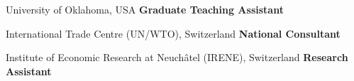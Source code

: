 	{%
		University of Oklahoma, USA}
	{%
		\textbf{Graduate Teaching Assistant}}
	{%
	}

		{%
			International Trade Centre (UN/WTO), Switzerland}
		{%
			\textbf{National Consultant}}
		{%
		}

		{%
			 Institute of Economic Research at Neuch\^atel (IRENE), Switzerland}
		{%
			\textbf{Research Assistant}}
		{%
		}
